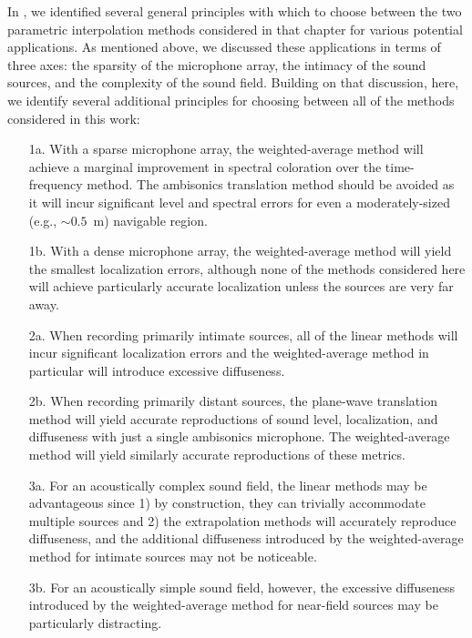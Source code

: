In , we identified several general principles with which to choose between the two parametric interpolation methods considered in that chapter for various potential applications.
As mentioned above, we discussed these applications in terms of three axes: the sparsity of the microphone array, the intimacy of the sound sources, and the complexity of the sound field. %
Building on that discussion, here, we identify several additional principles for choosing between all of the methods considered in this work:
\begin{enumerate}
\item[1a.] With a sparse microphone array, the weighted-average method will achieve a marginal improvement in spectral coloration over the time-frequency method.
The ambisonics translation method should be avoided as it will incur significant level and spectral errors for even a moderately-sized (e.g., $\sim0.5$~m) navigable region.
\item[1b.] With a dense microphone array, the weighted-average method will yield the smallest localization errors, although none of the methods considered here will achieve particularly accurate localization unless the sources are very far away.
\item[2a.] When recording primarily intimate sources, all of the linear methods will incur significant localization errors and the weighted-average method in particular will introduce excessive diffuseness.
\item[2b.] When recording primarily distant sources, the plane-wave translation method will yield accurate reproductions of sound level, localization, and diffuseness with just a single ambisonics microphone.
The weighted-average method will yield similarly accurate reproductions of these metrics.
\item[3a.] For an acoustically complex sound field, the linear methods may be advantageous since 1) by construction, they can trivially accommodate multiple sources and 2) the extrapolation methods will accurately reproduce diffuseness, and the additional diffuseness introduced by the weighted-average method for intimate sources may not be noticeable.
\item[3b.] For an acoustically simple sound field, however, the excessive diffuseness introduced by the weighted-average method for near-field sources may be particularly distracting.
\end{enumerate}

